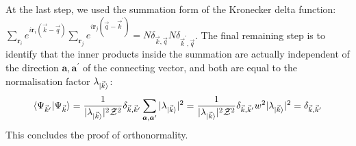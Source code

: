 At the last step, we used the summation form of the Kronecker delta function: \(\sum_{{\bm r}_i}e^{i {\bm r}_i \left( \vec k - \vec q \right) }\sum_{{\bm r}_j}e^{i {\bm r}_j \left( \vec q - \vec k^\prime \right) } = N \delta_{\vec k,\vec q}N \delta_{\vec k^\prime,\vec q}\). The final remaining step is to identify that the inner products inside the summation are actually independent of the direction \({\bm a}, {\bm a}^\prime\) of the connecting vector, and both are equal to the normalisation factor \(\lambda_{\ket{\vec k}}\):
\begin{equation}\begin{aligned}
	\braket{\Psi_{\vec k^\prime} | \Psi_{\vec k}} = \frac{1}{|\lambda_{\ket{\vec k}}|^2 \mathcal{Z}^2 } \delta_{\vec k, \vec k^\prime}\sum_{{\bm a},{\bm a}^\prime} |\lambda_{\ket{\vec k}}|^2 = \frac{1}{|\lambda_{\ket{\vec k}}|^2 \mathcal{Z}^2 } \delta_{\vec k, \vec k^\prime}w^2 |\lambda_{\ket{\vec k}}|^2 = \delta_{\vec k, \vec k^\prime}
\end{aligned}\end{equation}
This concludes the proof of orthonormality.

